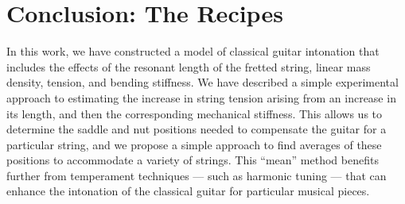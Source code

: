 %
%
%

 \section{Conclusion: The Recipes\label{sct:conc}}

 In this work, we have constructed a model of classical guitar intonation that includes the effects of the resonant length of the fretted string, linear mass density, tension, and bending stiffness. We have described a simple experimental approach to estimating the increase in string tension arising from an increase in its length, and then the corresponding mechanical stiffness. This allows us to determine the saddle and nut positions needed to compensate the guitar for a particular string, and we propose a simple approach to find averages of these positions to accommodate a variety of strings. This ``mean'' method benefits further from temperament techniques --- such as harmonic tuning --- that can enhance the intonation of the classical guitar for particular musical pieces.

